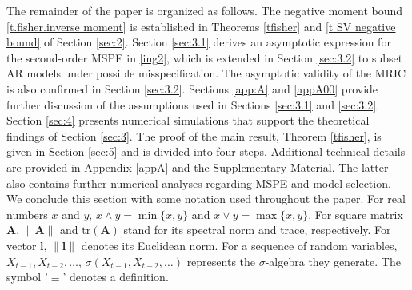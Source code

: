 \documentclass[ejsv2]{imsart}
\theoremstyle{plain}
\theoremstyle{definition}
\theoremstyle{remark}
\begin{document}
The remainder of the paper is organized as follows.
The negative moment bound
\eqref{t.fisher.inverse moment} is established
in Theorems \ref{tfisher} and \ref{t SV negative bound}
of
Section \ref{sec:2}. %
Section \ref{sec:3.1} derives an asymptotic expression for the second-order MSPE in \eqref{ing2}, which is extended in Section \ref{sec:3.2} to subset AR models under possible misspecification. The asymptotic validity of the MRIC is also confirmed in Section \ref{sec:3.2}. Sections
\ref{app:A} and \ref{appA00}
provide further discussion of the assumptions used in Sections \ref{sec:3.1} and \ref{sec:3.2}. Section \ref{sec:4} presents numerical simulations that support the theoretical findings of Section \ref{sec:3}. The proof of the main result, Theorem  \ref{tfisher}, is given in Section \ref{sec:5} and is divided into four steps. Additional technical details are provided in Appendix  \ref{appA} and the Supplementary Material. The latter also contains further numerical analyses regarding MSPE and model selection. 
We conclude this section with some notation used throughout the paper. For real
numbers $x$ and $y$, 
$x\wedge y= \min\{x,y\}$ and $x\vee y=\max\{x,y\}$. 
For square matrix $\mathbf{A}$,
$\|\mathbf{A}\|$ and $\mathrm{tr}(\mathbf{A})$
stand for its spectral norm and trace, respectively.
For vector $\bm{l}$,
$\|\bm{l}\|$ denotes its Euclidean norm. 
For a sequence of random variables, $X_{t-1}, X_{t-2}, \ldots$, 
$\sigma(X_{t-1}, X_{t-2}, \ldots)$ represents the $\sigma$-algebra they generate.  The symbol '$\equiv$' denotes a definition. 
\end{document}
